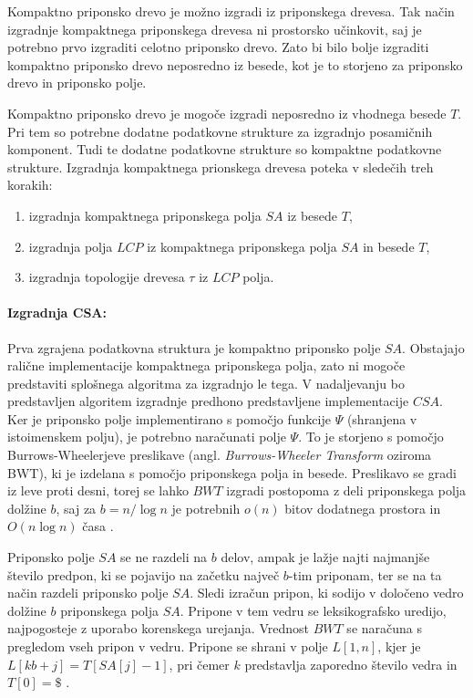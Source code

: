 Kompaktno priponsko drevo je možno izgradi iz priponskega drevesa. Tak način izgradnje kompaktnega priponskega drevesa ni prostorsko učinkovit, saj je potrebno prvo izgraditi celotno priponsko drevo. Zato bi bilo bolje izgraditi kompaktno priponsko drevo  neposredno iz besede, kot je to storjeno za priponsko drevo in priponsko polje.

Kompaktno priponsko drevo je mogoče izgradi neposredno iz vhodnega besede $T$. Pri tem so potrebne dodatne podatkovne strukture za izgradnjo posamičnih komponent. Tudi te dodatne podatkovne strukture so kompaktne podatkovne strukture. Izgradnja kompaktnega prionskega drevesa poteka v sledečih treh korakih:
\begin{enumerate}
    \item izgradnja kompaktnega priponskega polja $SA$ iz besede $T$,
    \item izgradnja polja $LCP$ iz kompaktnega priponskega polja $SA$ in besede $T$,
    \item izgradnja topologije drevesa $\tau$ iz $LCP$ polja.
\end{enumerate}

\paragraph{Izgradnja CSA:}

Prva zgrajena podatkovna struktura je kompaktno priponsko polje $SA$. Obstajajo ralične implementacije kompaktnega priponskega polja, zato ni mogoče predstaviti splošnega algoritma za izgradnjo le tega. V nadaljevanju bo predstavljen algoritem izgradnje predhono predstavljene implementacije $CSA$. Ker je priponsko polje implementirano s pomočjo funkcije $\Psi$ (shranjena v istoimenskem polju), je potrebno naračunati polje $\Psi$. To je storjeno s pomočjo Burrows-Wheelerjeve preslikave (angl. \textit{Burrows-Wheeler Transform} oziroma BWT), ki je izdelana s pomočjo priponskega polja in besede. Preslikavo se gradi iz leve proti desni, torej se lahko $BWT$ izgradi postopoma z deli priponskega polja dolžine $b$, saj za $b=n/\log{n}$ je potrebnih $o(n)$ bitov dodatnega prostora in $O(n\log{n})$ časa \cite{Navarro2016}.

Priponsko polje $SA$ se ne razdeli na $b$ delov, ampak je lažje najti najmanjše število predpon, ki se pojavijo na začetku največ $b$-tim priponam, ter se na ta način razdeli priponsko polje $SA$. Sledi izračun pripon, ki sodijo v določeno vedro dolžine $b$ priponskega polja $SA$. Pripone v tem vedru se leksikografsko uredijo, najpogosteje z uporabo korenskega urejanja. Vrednost $BWT$ se naračuna s pregledom vseh pripon v vedru. Pripone se shrani v polje $L[1,n]$, kjer je $L[kb+j]=T[SA[j]-1]$, pri čemer $k$ predstavlja zaporedno število vedra in $T[0]=\$$ \cite{Navarro2016}.


